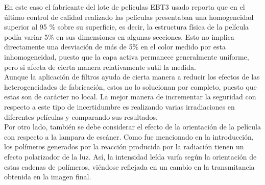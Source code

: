 En este caso el fabricante del lote de películas EBT3 usado reporta que en el último control de calidad realizado las películas presentaban una homogeneidad superior al 95 \% sobre su superficie, es decir, la estructura física de la película podía variar 5\% en sus dimensiones en algunas secciones. Esto no implica directamente una desviación de más de 5\% en el color medido por esta inhomogeneidad, puesto que la capa activa permanece generalmente uniforme, pero si afecta de cierta manera relativamente sutil la medida. \\ 

Aunque la aplicación de filtros ayuda de cierta manera a reducir los efectos de las heterogeneidades de fabricación, estos no lo solucionan por completo, puesto que estas son de carácter no local. La mejor manera de incrementar la seguridad con respecto a este tipo de incertidumbre es realizando varias irradiaciones en  diferentes películas y comparando sus resultados.\\

Por otro lado, también se debe considerar el efecto de la orientación de la película con respecto a la lampara de escáner. Como fue mencionado en la introducción, los polímeros generados por la reacción producida por la radiación tienen un efecto polarizador de la luz. Así, la intensidad leída varía según la orientación de estas cadenas de polímeros, viéndose reflejada en un cambio en la transmitancia obtenida en la imagen final.\\









